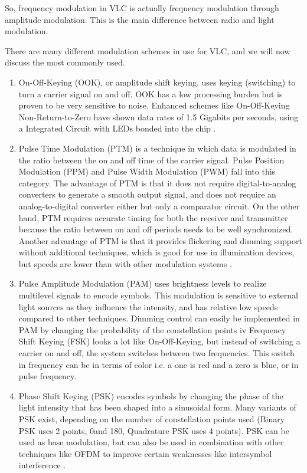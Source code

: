So, frequency modulation in VLC is actually frequency modulation through amplitude
modulation. This is the main difference between radio and light modulation.

There are many different modulation schemes in use for VLC, and we will now
discuss the most commonly used.

\begin{enumerate}

\item \label{ook} On-Off-Keying (OOK), or amplitude shift keying, uses keying (switching) to
turn a carrier signal on and off. OOK has a low processing burden but is
proven to be very sensitive to noise. Enhanced schemes like On-Off-Keying
Non-Return-to-Zero have shown data rates of 1.5 Gigabits per seconds,
using a Integrated Circuit with LEDs bonded into the chip \citep{ook-450}.

\item Pulse Time Modulation (PTM) is a technique in which data is modulated
in the ratio between the on and off time of the carrier signal. Pulse Position
Modulation (PPM) and Pulse Width Modulation (PWM) fall into this
category. The advantage of PTM is that it does not require digital-to-analog
converters to generate a smooth output signal, and does not require an
analog-to-digital converter either but only a comparator circuit. On the other
hand, PTM requires accurate timing for both the receiver and transmitter
because the ratio between on and off periods needs to be well synchronized.
Another advantage of PTM is that it provides flickering and dimming
support without additional techniques, which is good for use in illumination
devices, but speeds are lower than with other modulation systems \citep{ppm}.


\item  Pulse Amplitude Modulation (PAM) uses brightness levels to realize multilevel
signals to encode symbols. This modulation is sensitive to external
light sources as they influence the intensity, and has relative low speeds
compared to other techniques. Dimming control can easily be implemented
in PAM by changing the probability of the constellation points \citep{diming}
iv Frequency Shift Keying (FSK) looks a lot like On-Off-Keying, but instead of
switching a carrier on and off, the system switches between two frequencies.
This switch in frequency can be in terms of color i.e. a one is red and
a zero is blue, or in pulse frequency.

\item Phase Shift Keying (PSK) encodes symbols by changing the phase of the
light intensity that has been shaped into a sinusoidal form. Many variants
of PSK exist, depending on the number of constellation points used (Binary
PSK uses 2 points, 0\degree  and 180\degree , Quadrature PSK uses 4 points). PSK
can be used as base modulation, but can also be used in combination
with other techniques like OFDM to improve certain weaknesses like intersymbol
interference \citep{ofdm-plc}.


\end{enumerate}
